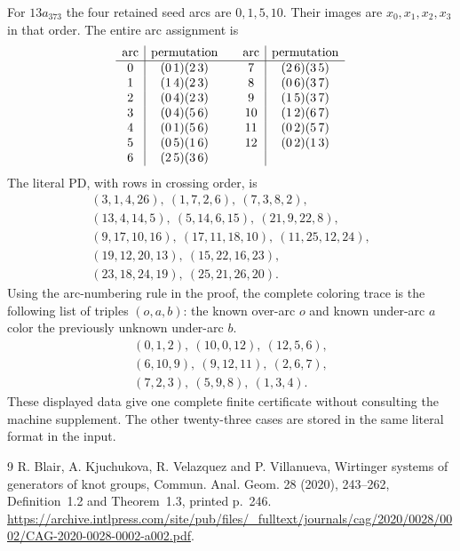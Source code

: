 \documentclass[11pt]{article}
\begin{document}
For $13a_{373}$ the four retained seed arcs are $0,1,5,10$. Their images
are $x_0,x_1,x_2,x_3$ in that order. The entire arc assignment is
\[
\begin{array}{c|c@{\qquad}c|c}
\text{arc}&\text{permutation}&\text{arc}&\text{permutation}\\\hline
0 & $(0\,1)(2\,3)$ & 7 & $(2\,6)(3\,5)$\\
1 & $(1\,4)(2\,3)$ & 8 & $(0\,6)(3\,7)$\\
2 & $(0\,4)(2\,3)$ & 9 & $(1\,5)(3\,7)$\\
3 & $(0\,4)(5\,6)$ & 10 & $(1\,2)(6\,7)$\\
4 & $(0\,1)(5\,6)$ & 11 & $(0\,2)(5\,7)$\\
5 & $(0\,5)(1\,6)$ & 12 & $(0\,2)(1\,3)$\\
6 & $(2\,5)(3\,6)$ & &\\
\end{array}
\]
The literal PD, with rows in crossing order, is
\[
\begin{gathered}
(3,1,4,26),\ (1,7,2,6),\ (7,3,8,2),\\
(13,4,14,5),\ (5,14,6,15),\ (21,9,22,8),\\
(9,17,10,16),\ (17,11,18,10),\ (11,25,12,24),\\
(19,12,20,13),\ (15,22,16,23),\\
(23,18,24,19),\ (25,21,26,20).
\end{gathered}
\]
Using the arc-numbering rule in the proof, the complete coloring trace
is the following list of triples $(o,a,b)$: the known over-arc $o$ and
known under-arc $a$ color the previously unknown under-arc $b$.
\[
\begin{gathered}
(0,1,2),\ (10,0,12),\ (12,5,6),\\
(6,10,9),\ (9,12,11),\ (2,6,7),\\
(7,2,3),\ (5,9,8),\ (1,3,4).
\end{gathered}
\]
These displayed data give one complete finite certificate without
consulting the machine supplement. The other twenty-three cases are
stored in the same literal format in the input.

\begin{thebibliography}{9}
R. Blair, A. Kjuchukova, R. Velazquez and P. Villanueva,
Wirtinger systems of generators of knot groups,
Commun. Anal. Geom. 28 (2020), 243--262,
Definition~1.2 and Theorem~1.3, printed p.~246.
\url{https://archive.intlpress.com/site/pub/files/_fulltext/journals/cag/2020/0028/0002/CAG-2020-0028-0002-a002.pdf}.
\end{thebibliography}
\end{document}
